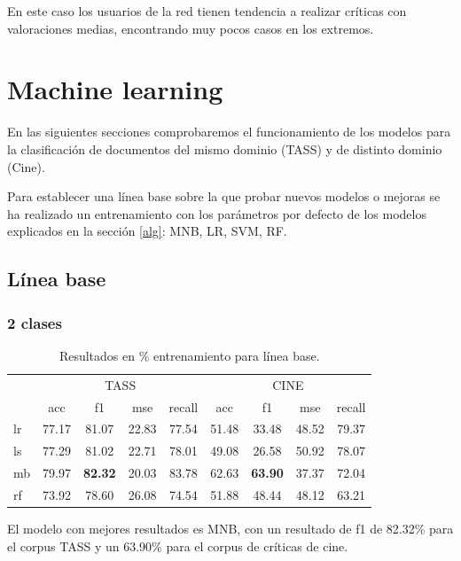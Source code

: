 En este caso los usuarios de la red tienen tendencia a realizar críticas con valoraciones medias, encontrando muy pocos casos en los extremos.


\section{Machine learning}\label{sect:ML}

En las siguientes secciones comprobaremos el funcionamiento de los modelos para la clasificación de documentos del mismo dominio (TASS) y de distinto dominio (Cine).

Para establecer una línea base sobre la que probar  nuevos modelos o mejoras se ha realizado un entrenamiento con los parámetros por defecto de los modelos explicados en la sección \ref{alg}: MNB, LR, SVM, RF.


\subsection{Línea base}

\subsubsection{2 clases}

\begin{table}[H]
	\centering
	\begin{tabular}{|l|cccc|cccc|}
		\hline
		& \multicolumn{4}{c|}{TASS} & \multicolumn{4}{c|}{CINE} \\
		\cline{2-9}
		&    acc &     f1 &    mse &  recall & acc &     f1 &    mse &  recall \\
		\hline
		lr      &  77.17 &  81.07 &  22.83 &   77.54 &  51.48 &  33.48 &  48.52 &   79.37 \\
		ls      &  77.29 &  81.02 &  22.71 &   78.01 &  49.08 &  26.58 &  50.92 &   78.07 \\
		mb      &  79.97 &  \textbf{82.32} &  20.03 &   83.78 &  62.63 &  \textbf{63.90} &  37.37 &   72.04 \\
		rf      &  73.92 &  78.60 &  26.08 &   74.54 &  51.88 &  48.44 &  48.12 &   63.21 \\
		\hline
	\end{tabular}
	\caption{Resultados en \% entrenamiento para línea base.}
	\label{result-línea-base}
\end{table}

El modelo con mejores resultados es MNB, con un resultado de f1 de 82.32\% para el corpus TASS y un 63.90\% para el corpus de críticas de cine.


